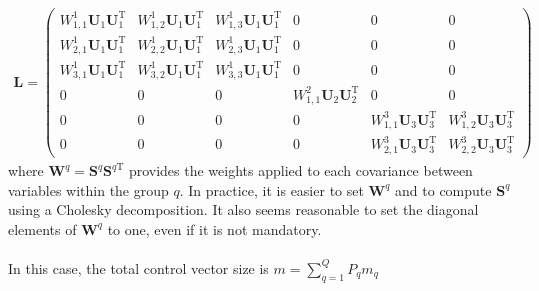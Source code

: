 \documentclass[12pt]{scrartcl}
\begin{document}
\begin{align}
\mathbf{L} = \left( \begin{array}{ccc|c|cc}
W^1_{1,1} \mathbf{U}_1 \mathbf{U}_1^\mathrm{T} & W^1_{1,2} \mathbf{U}_1 \mathbf{U}_1^\mathrm{T} & W^1_{1,3} \mathbf{U}_1 \mathbf{U}_1^\mathrm{T} & 0 & 0 & 0 \\
W^1_{2,1} \mathbf{U}_1 \mathbf{U}_1^\mathrm{T} & W^1_{2,2} \mathbf{U}_1 \mathbf{U}_1^\mathrm{T} & W^1_{2,3} \mathbf{U}_1 \mathbf{U}_1^\mathrm{T} & 0 & 0 & 0 \\
W^1_{3,1} \mathbf{U}_1 \mathbf{U}_1^\mathrm{T} & W^1_{3,2} \mathbf{U}_1 \mathbf{U}_1^\mathrm{T} & W^1_{3,3} \mathbf{U}_1 \mathbf{U}_1^\mathrm{T} & 0 & 0 & 0 \\[0.3ex]
\hline
0 & 0 & 0 & W^2_{1,1} \mathbf{U}_2 \mathbf{U}_2^\mathrm{T} & 0 & 0 \\[0.3ex]
\hline
0 & 0 & 0 & 0 & W^3_{1,1} \mathbf{U}_3 \mathbf{U}_3^\mathrm{T} & W^3_{1,2} \mathbf{U}_3 \mathbf{U}_3^\mathrm{T} \\
0 & 0 & 0 & 0 & W^3_{2,1} \mathbf{U}_3 \mathbf{U}_3^\mathrm{T} & W^3_{2,2} \mathbf{U}_3 \mathbf{U}_3^\mathrm{T}
\end{array} \right)
\end{align}
where $\mathbf{W}^q = \mathbf{S}^q \mathbf{S}^{q\mathrm{T}}$ provides the weights applied to each covariance between variables within the group $q$. In practice, it is easier to set $\mathbf{W}^q$ and to compute $\mathbf{S}^q$ using a Cholesky decomposition. It also seems reasonable to set the diagonal elements of $\mathbf{W}^q$ to one, even if it is not mandatory.\\
$  $\\
In this case, the total control vector size is $\displaystyle m = \sum_{q=1}^Q P_q m_q$
\end{document}
